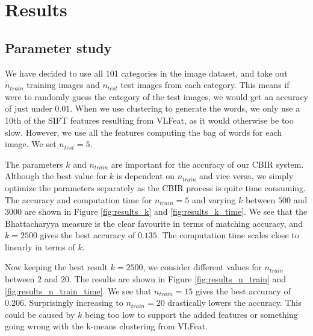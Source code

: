 \documentclass[11pt,a4paper]{article}
\begin{document}
\section{Results}

\subsection{Parameter study}

We have decided to use all 101 categories in the image dataset, and take out $n_{train}$ training images and $n_{test}$ test images from each category. This means if were to randomly guess the category of the test images, we would get an accuracy of just under $0.01$. When we use clustering to generate the words, we only use a 10th of the SIFT features resulting from VLFeat, as it would otherwise be too slow. However, we use all the features computing the bag of words for each image. We set $n_{test} = 5$.

The parameters $k$ and $n_{train}$ are important for the accuracy of our CBIR system. Although the best value for $k$ is dependent on $n_{train}$ and vice versa, we simply optimize the parameters separately as the CBIR process is quite time consuming. The accuracy and computation time for $n_{train} = 5$ and varying $k$ between $500$ and $3000$ are shown in Figure \ref{fig:results_k} and \ref{fig:results_k_time}. We see that the Bhattacharyya measure is the clear favourite in terms of matching accuracy, and $k = 2500$ gives the best accuracy of $0.135$. The computation time scales close to linearly in terms of $k$.

Now keeping the best result $k = 2500$, we consider different values for $n_{train}$ between $2$ and $20$. The results are shown in Figure \ref{fig:results_n_train} and \ref{fig:results_n_train_time}. We see that $n_{train} = 15$ gives the best accuracy of $0.206$. Surprisingly increasing to $n_{train} = 20$ drastically lowers the accuracy. This could be caused by $k$ being too low to support the added features or something going wrong with the k-means clustering from VLFeat.
\end{document}
